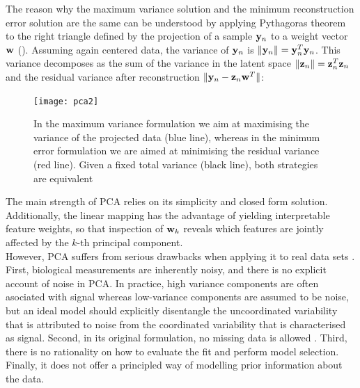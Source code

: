 The reason why the maximum variance solution and the minimum reconstruction error solution are the same can be understood by applying Pythagoras theorem to the right triangle defined by the projection of a sample ${\bf y}_{n}$ to a weight vector ${\bf w}$ ().
Assuming again centered data, the variance of ${\bf y}_{n}$ is $\|{\bf y}_{n}\| = {\bf y}_{n}^T {\bf y}_{n}$. This variance decomposes as the sum of the variance in the latent space $\|{\bf z}_{n}\| = {\bf z}_{n}^T {\bf z}_{n}$ and the residual variance after reconstruction $\|{\bf y}_{n} - {\bf z}_{n} {\bf w}^T \|$:

\begin{figure}[H]
	\centering
	\texttt{[image: pca2]}
	\caption[Maximizing the variance in the principal component space is equivalent to minimizing the data reconstruction error]{In the maximum variance formulation we aim at maximising the variance of the projected data (blue line), whereas in the minimum error formulation we are aimed at minimising the residual variance (red line). Given a fixed total variance (black line), both strategies are equivalent}
	\label{fig:pca2}
\end{figure}

The main strength of PCA relies on its simplicity and closed form solution. Additionally, the linear mapping has the advantage of yielding interpretable feature weights, so that inspection of ${\bf w}_k$ reveals which features are jointly affected by the $k$-th principal component.\\
However, PCA suffers from serious drawbacks when applying it to real data sets \cite{Li2017b}. First, biological measurements are inherently noisy, and there is no explicit account of noise in PCA. In practice, high variance components are often asociated with signal whereas low-variance components are assumed to be noise, but an ideal model should explicitly disentangle the uncoordinated variability that is attributed to noise from the coordinated variability that is characterised as signal. Second, in its original formulation, no missing data is allowed \cite{Ilin2010}. Third, there is no rationality on how to evaluate the fit and perform model selection. Finally, it does not offer a principled way of modelling prior information about the data.

